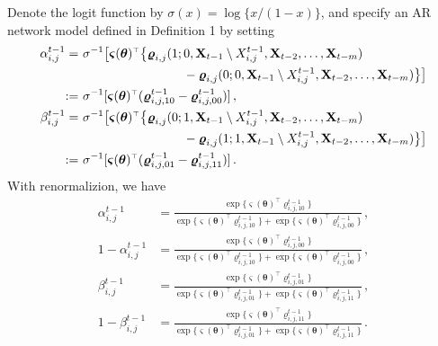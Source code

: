 \documentclass[12pt]{article}
\newcommand{\bvarsigma}{\boldsymbol \varsigma}
\newcommand{\bvarrho}{\boldsymbol \varrho}
\newcommand{\btheta}{\boldsymbol \theta}
\def\T{{\scriptscriptstyle \top} }
\newcommand{\0}{{\bf 0}}
\begin{document}
Denote the logit function by $\sigma(x) = \log\{x/(1-x)\}$, and specify an AR network model defined in Definition 1 by setting
\begin{align}
  \alpha_{i,j}^{t-1} %
  =&~ \sigma^{-1} \big[ \bvarsigma(\btheta)^{\T} \big\{ \bvarrho_{i,j}(1 ; 0 , {\bf X}_{t-1} \setminus X_{i,j}^{t-1}, {\bf X}_{t-2}, \ldots, {\bf X}_{t-m}) \notag\\
  &~~~~~~~~~~~~~~~~~~~~~~~~~- \bvarrho_{i,j}(0 ; 0 , {\bf X}_{t-1} \setminus X_{i,j}^{t-1}, {\bf X}_{t-2}, \ldots, {\bf X}_{t-m} )\big\} \big] \notag\\
  :=&~ \sigma^{-1}[ \bvarsigma(\btheta)^{\T}(\bvarrho_{i,j,10}^{t-1} - \bvarrho_{i,j,00}^{t-1})]\,,\label{eq:aijsupp}\\
  \beta_{i,j}^{t-1} %
  =&~ \sigma^{-1} \big[ \bvarsigma(\btheta)^{\T} \big\{ \bvarrho_{i,j}(0 ; 1 , {\bf X}_{t-1} \setminus X_{i,j}^{t-1}, {\bf X}_{t-2}, \ldots, {\bf X}_{t-m})\notag \\
  &~~~~~~~~~~~~~~~~~~~~~~~~~- \bvarrho_{i,j}(1 ; 1 , {\bf X}_{t-1} \setminus X_{i,j}^{t-1}, {\bf X}_{t-2}, \ldots, {\bf X}_{t-m} )\big\} \big]\notag \\
  :=&~ \sigma^{-1}[ \bvarsigma(\btheta)^{\T}(\bvarrho_{i,j,01}^{t-1} - \bvarrho_{i,j,11}^{t-1})]\,.\label{eq:bijsupp}
\end{align}
With renormalizion, we have
\begin{align*}
  \alpha_{i,j}^{t-1} &= \frac{\exp \{ \bvarsigma(\btheta)^{\T} \bvarrho_{i,j,10}^{t-1} \}}{\exp \{  \bvarsigma(\btheta)^{\T} \bvarrho_{i,j,10}^{t-1}\} + \exp \{  \bvarsigma(\btheta)^{\T} \bvarrho_{i,j,00}^{t-1}\}} \,,\\
  1 - \alpha_{i,j}^{t-1} &= \frac{\exp \{ \bvarsigma(\btheta)^{\T} \bvarrho_{i,j,00}^{t-1} \}}{\exp \{  \bvarsigma(\btheta)^{\T} \bvarrho_{i,j,10}^{t-1}\} + \exp \{  \bvarsigma(\btheta)^{\T} \bvarrho_{i,j,00}^{t-1}\}}\,, \\
  \beta_{i,j}^{t-1} &= \frac{\exp \{ \bvarsigma(\btheta)^{\T} \bvarrho_{i,j,01}^{t-1} \}}{\exp \{  \bvarsigma(\btheta)^{\T} \bvarrho_{i,j,01}^{t-1}\} + \exp \{  \bvarsigma(\btheta)^{\T} \bvarrho_{i,j,11}^{t-1}\}}\,, \\
  1 - \beta_{i,j}^{t-1} &= \frac{\exp \{ \bvarsigma(\btheta)^{\T} \bvarrho_{i,j,11}^{t-1} \}}{\exp \{  \bvarsigma(\btheta)^{\T} \bvarrho_{i,j,01}^{t-1}\} + \exp \{  \bvarsigma(\btheta)^{\T} \bvarrho_{i,j,11}^{t-1}\}}\,. 
\end{align*}
\end{document}
